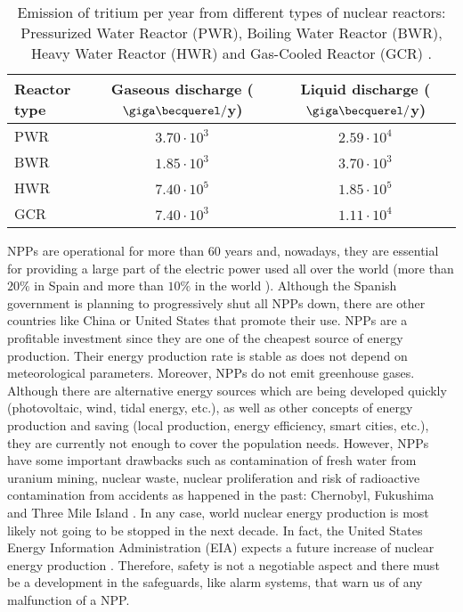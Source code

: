 \begin{table}[htbp]
\centering{}%
\begin{tabular}{lcc}
\toprule 
Reactor type & Gaseous discharge ($\giga\becquerel/$y) & Liquid discharge ($\giga\becquerel/$y)\tabularnewline
\midrule
\midrule 
PWR & $3.70\cdot 10^{3}$ & $2.59\cdot 10^{4}$ \tabularnewline
BWR & $1.85\cdot 10^{3}$ & $3.70\cdot 10^{3}$ \tabularnewline
HWR & $7.40\cdot 10^{5}$ & $1.85\cdot 10^{5}$ \tabularnewline
GCR & $7.40\cdot 10^{3}$ & $1.11\cdot 10^{4}$ \tabularnewline
\bottomrule
\end{tabular}
\caption{Emission of tritium per year from different types of nuclear reactors: Pressurized Water Reactor (PWR), Boiling Water Reactor (BWR), Heavy Water Reactor (HWR) and Gas-Cooled Reactor (GCR) \cite{CommonEmissionTritium}.}
\label{tab:TritiumEmisionsNPPs}
\end{table}

NPPs are operational for more than 60 years and, nowadays, they are essential for providing a large part of the electric power used all over the world (more than $20\%$ in Spain \cite{PercentageEnergySpain} and more than $10\%$ in the world \cite{PercentageEnergyWorld}). Although the Spanish government is planning to progressively shut all NPPs down, there are other countries like China \cite{60ReactorsChina} or United States \cite{35MillionsUSA} that promote their use. NPPs are a profitable investment since they are one of the cheapest source of energy production. Their energy production rate is stable as does not depend on meteorological parameters. Moreover, NPPs do not emit greenhouse gases. Although there are alternative energy sources which are being developed quickly (photovoltaic, wind, tidal energy, etc.), as well as other concepts of energy production and saving (local production, energy efficiency, smart cities, etc.), they are currently not enough to cover the population needs. However, NPPs have some important drawbacks such as contamination of fresh water from uranium mining, nuclear waste, nuclear proliferation and risk of radioactive contamination from accidents as happened in the past: Chernobyl, Fukushima and Three Mile Island \cite{ThreeMileIsland}. In any case, world nuclear energy production is most likely not going to be stopped in the next decade. In fact, the United States Energy Information Administration (EIA) expects a future increase of nuclear energy production \cite{EIAOutlook}. Therefore, safety is not a negotiable aspect and there must be a development in the safeguards, like alarm systems, that warn us of any malfunction of a NPP. 

